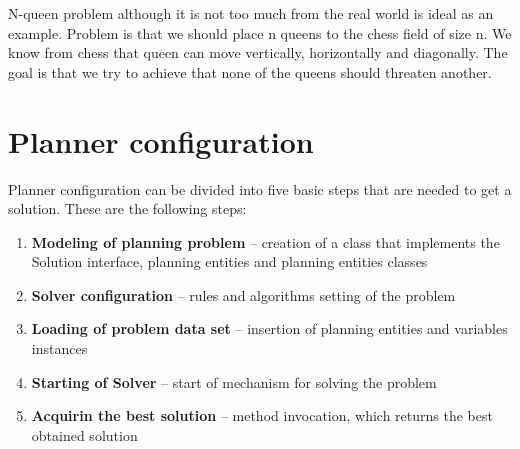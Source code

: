 N-queen problem although it is not too much from the real world is ideal as an example.  Problem is that we should place n queens to the chess field of size n. We know from chess that queen can move vertically, horizontally and diagonally. The goal is that we try to achieve that none of the queens should threaten another.

\section{Planner configuration}\label{plannerConf}
Planner configuration can be divided into five basic steps that are needed to get a solution. These are the following steps:

\begin{enumerate}
\item \textbf{Modeling of planning problem} -- creation of a class that implements the Solution interface, planning entities and planning entities classes
\item \textbf{Solver configuration} -- rules and algorithms setting of the problem
\item \textbf{Loading of problem data set} -- insertion of planning entities and variables instances  
\item \textbf{Starting of Solver} -- start of mechanism for solving the problem
\item \textbf{Acquirin the best solution} -- method invocation, which returns the best obtained solution 
\end{enumerate}


